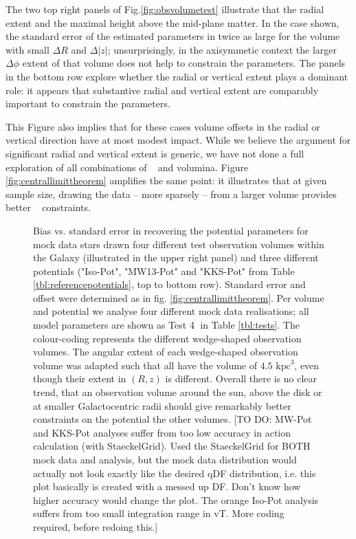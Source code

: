 The two top right panels of Fig.\ref{fig:obsvolumetest} illustrate that the radial extent and the maximal height above the mid-plane matter. In the case shown, the standard error of the estimated parameters in twice as large for the volume with small $\Delta R$ and $\Delta |z|$; unsurprisingly, in the axisymmetic context the larger $\Delta\phi$ extent of that volume does not help to constrain the parameters. The panels in the bottom row explore whether the radial or vertical extent plays a dominant role: it appears that substantive radial and vertical extent are comparably important to constrain the parameters. 

This Figure also implies that for these cases volume offsets in the radial or vertical direction have at most modest impact. While we believe the argument for significant radial and vertical extent is generic, we have not done a full exploration of all combinations of \pmodel~ and volumina. Figure \ref{fig:centrallimittheorem}  amplifies the same point: it illustrates that at given sample size, drawing the data -- more sparsely -- from a larger volume provides better \pmodel~ constraints. 




\begin{figure}
\caption{Bias vs. standard error in recovering the potential parameters for mock data stars drawn four different test observation volumes within the Galaxy (illustrated in the upper right panel) and three different potentials ("Iso-Pot", "MW13-Pot" and "KKS-Pot" from Table \ref{tbl:referencepotentials}, top to bottom row). Standard error and offset were determined as in fig. \ref{fig:centrallimittheorem}. Per volume and potential we analyse four different mock data realisations; all model parameters are shown as Test \textcircled{4} in Table \ref{tbl:tests}. The colour-coding represents the different wedge-shaped observation volumes. The angular extent of each wedge-shaped observation volume was adapted such that all have the volume of $4.5 \text{ kpc}^3$, even though their extent in $(R,z)$ is different.  Overall there is no clear trend, that an observation volume around the sun, above the disk or at smaller Galactocentric radii should give remarkably better constraints on the potential the other volumes. [TO DO: MW-Pot and KKS-Pot analyses suffer from too low accuracy in action calculation (with StaeckelGrid). Used the StaeckelGrid for BOTH mock data and analysis, but the mock data distribution would actually not look exactly like the desired qDF distribution, i.e. this plot basically is created with a messed up DF. Don't know how higher accuracy would change the plot. The orange Iso-Pot analysis suffers from too small integration range in vT. More coding required, before redoing this.]}
\label{fig:wedFlexVol_bias_vs_SE}
\end{figure}

